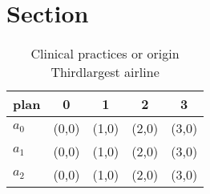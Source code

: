\documentclass[a4paper]{article}
\begin{document}
\section{Section}

\begin{table}
\begin{adjustbox}{width=0.6\columnwidth}
\begin{tabular}{|l|l|l|l|l|}
\hline
\textbf{plan} & \multicolumn{1}{c|}{\textbf{0}} & \multicolumn{1}{c|}{\textbf{1}} & \multicolumn{1}{c|}{\textbf{2}} & \multicolumn{1}{c|}{\textbf{3}} \\ \hline
\textbf{$a_0$}  & (0,0) & (1,0) & (2,0) & (3,0) \\ \hline
\textbf{$a_1$}  & (0,0) & (1,0) & (2,0) & (3,0) \\ \hline
\textbf{$a_2$}  & (0,0) & (1,0) & (2,0) & (3,0) \\ \hline
\end{tabular}
\end{adjustbox}
\caption{Clinical practices or origin Thirdlargest airline
}
\end{table}
\end{document}
